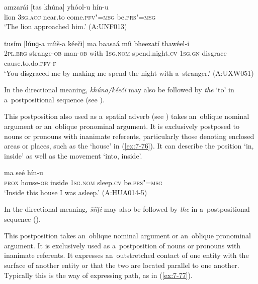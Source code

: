 \begin{exe}
\ex
\label{ex:7-74}
\gll amzarái [tas khúna] yhóol-u hín-u \\
lion \textsc{3sg.acc} near.to come.\textsc{pfv"=msg } be.\textsc{prs"=msg} \\
\glt `The lion approached him.' (A:UNF013)
\end{exe}
\begin{exe}
\ex
\label{ex:7-75}
\gll tusím [lúuɡ-a míiš-a kéeči] ma baasaá míi bheezatí thawéel-i \\
\textsc{2pl.erg} strange-\textsc{ob} man-\textsc{ob} with \textsc{1sg.nom} spend.night.\textsc{cv} \textsc{1sg.gn} disgrace cause.to.do.\textsc{pfv-f} \\
\glt `You disgraced me by making me spend the night with a~stranger.' (A:UXW051)
\end{exe}

In the directional meaning, \textit{khúna/kéeči} may also be followed by \textit{the} `to' in a~postpositional sequence (see ).


 This postposition also used as a~spatial adverb (see ) takes an~oblique nominal argument or an~oblique pronominal argument. It is exclusively postposed to nouns or pronouns with inanimate referents, particularly those denoting enclosed areas or places, such as the `house' in (\ref{ex:7-76}). It can describe the position `in, inside' as well as the movement `into, inside'.

\begin{exe}
\ex
\label{ex:7-76}
 ma seé hín-u  \\
\textsc{prox} house-\textsc{ob}  inside \textsc{1sg.nom} sleep.\textsc{cv} be.\textsc{prs"=msg}  \\
\glt `Inside this house I was asleep.' (A:HUA014-5)
\end{exe}

In the directional meaning, \textit{šíiṭi} may also be followed by \textit{the} in a~postpositional sequence ().


 This postposition takes an~oblique nominal argument or an~oblique pronominal argument. It is exclusively used as a~postposition of nouns or pronouns with inanimate referents. It expresses an~outstretched contact of one entity with the surface of another entity or that the two are located parallel to one another. Typically this is the way of expressing path, as in (\ref{ex:7-77}).

